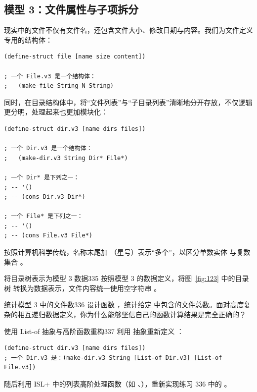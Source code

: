 \subsection{模型 3：文件属性与子项拆分}

现实中的文件不仅有文件名，还包含文件大小、修改日期与内容。我们为文件定义专用的结构体：

\begin{lstlisting}[language=BSL]
(define-struct file [name size content])

; 一个 File.v3 是一个结构体：
;   (make-file String N String)
\end{lstlisting}

同时，在目录结构体中，将“文件列表”与“子目录列表”清晰地分开存放，不仅逻辑更分明，处理起来也更加模块化：

\begin{lstlisting}[language=BSL]
(define-struct dir.v3 [name dirs files])

; 一个 Dir.v3 是一个结构体：
;   (make-dir.v3 String Dir* File*)

; 一个 Dir* 是下列之一：
; -- '()
; -- (cons Dir.v3 Dir*)

; 一个 File* 是下列之一：
; -- '()
; -- (cons File.v3 File*)
\end{lstlisting}

按照计算机科学传统，名称末尾加 \code{*}（星号）表示“多个”，以区分单数实体  与复数集合 。

\begin{exercise}{将目录树表示为模型 3 数据}{335}
按照模型 3 的数据定义，将图~\ref{fig:123} 中的目录树  转换为数据表示，文件内容统一使用空字符串 。
\end{exercise}

\begin{exercise}{统计模型 3 中的文件数}{336}
设计函数 ，统计给定  中包含的文件总数。面对高度复杂的相互递归数据定义，你为什么能够坚信自己的函数计算结果是完全正确的？
\end{exercise}

\begin{exercise}{使用 List-of 抽象与高阶函数重构}{337}
利用  抽象重新定义 ：
\begin{lstlisting}[language=BSL]
(define-struct dir.v3 [name dirs files])
; 一个 Dir.v3 是：(make-dir.v3 String [List-of Dir.v3] [List-of File.v3])
\end{lstlisting}
随后利用 ISL+ 中的列表高阶处理函数（如 、），重新实现练习 336 中的 。
\end{exercise}

